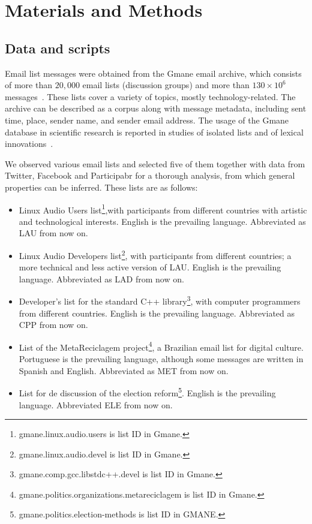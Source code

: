 

\chapter{Materials and Methods}\label{ch:mat}

\section{Data and scripts}\label{sec:data}\label{scripts}
Email list messages were obtained from
the Gmane email archive, which consists of more than $20,000$
email lists (discussion groups) and more than $130\times 10^6$ messages~\cite{Gmanewikipedia}. These lists cover a variety of topics, mostly technology-related. The archive can be described as a corpus along with message metadata, including sent time, place, sender name, and sender email address.
The usage of the Gmane database in scientific research is reported in studies of isolated lists and of lexical innovations~\cite{Gmane2,bird}. 

We observed various email lists and selected five of them together with data from Twitter, Facebook and Participabr for a thorough analysis,
from which general properties can be inferred. These lists are as follows:

\begin{itemize}
\item Linux Audio Users list\footnote{gmane.linux.audio.users is list ID in Gmane.},with participants from different countries with artistic and technological interests. English is the prevailing language. Abbreviated as LAU from now on.

\item Linux Audio Developers list\footnote{gmane.linux.audio.devel is list ID in Gmane.}, with participants from different countries; a more technical and less active version of LAU. English is the prevailing language. Abbreviated as LAD from now on.

\item Developer's list for the standard C++ library\footnote{gmane.comp.gcc.libstdc++.devel is list ID in Gmane.}, with computer programmers from different countries. English is the prevailing language. Abbreviated as CPP from now on.
\item List of the MetaReciclagem project\footnote{gmane.politics.organizations.metareciclagem is list ID in Gmane.}, a Brazilian email list for digital culture. 	Portuguese is the prevailing language, although some messages are written in Spanish and English. Abbreviated as MET from now on.
\item List for de discussion of the election reform\footnote{gmane.politics.election-methods is list ID in GMANE.}. English is the prevailing language. Abbreviated ELE from now on.
\end{itemize} 

